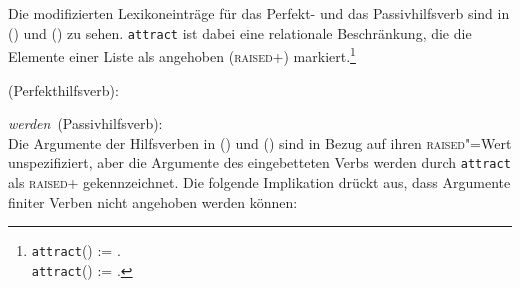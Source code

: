 {Die modifizierten Lexikoneinträge für das Perfekt- und das Passivhilfsverb sind in ()
und () zu sehen. 
\texttt{attract} ist dabei eine relationale Beschränkung, die die Elemente einer Liste als
angehoben (\textsc{raised}+) markiert.\footnote{
\texttt{attract}(\eliste) := \eliste.\\
\texttt{attract}() := .
}

\eas
\mbox{\haben (Perfekthilfsverb):}\\
\zs

\eas
\label{le-werden-passive-da-spirits}%
\mbox{\emph{werden} (Passivhilfsverb):}\\
\zs
Die Argumente der Hilfsverben in () und () sind in Bezug auf ihren \textsc{raised}"=Wert
unspezifiziert, aber die Argumente des eingebetteten Verbs werden durch \texttt{attract}
als \textsc{raised}+ gekennzeichnet. Die folgende Implikation drückt aus, dass Argumente finiter
Verben nicht angehoben werden können:

}
